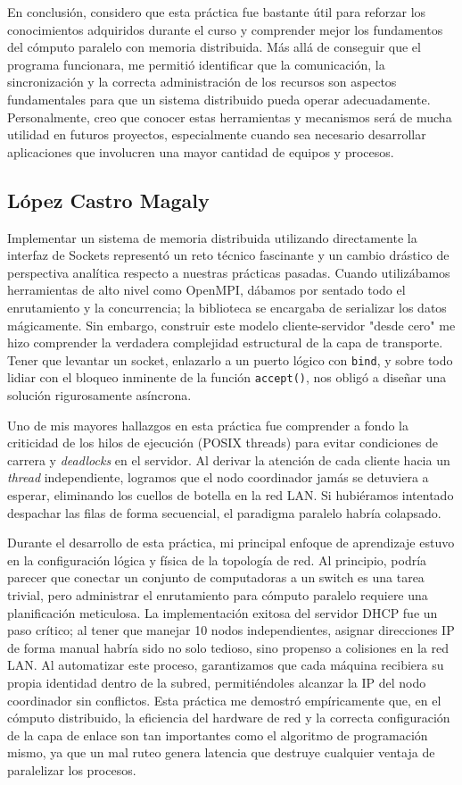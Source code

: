 En conclusión, considero que esta práctica fue bastante útil para reforzar los conocimientos adquiridos durante el curso y comprender mejor los fundamentos del cómputo paralelo con memoria distribuida. Más allá de conseguir que el programa funcionara, me permitió identificar que la comunicación, la sincronización y la correcta administración de los recursos son aspectos fundamentales para que un sistema distribuido pueda operar adecuadamente. Personalmente, creo que conocer estas herramientas y mecanismos será de mucha utilidad en futuros proyectos, especialmente cuando sea necesario desarrollar aplicaciones que involucren una mayor cantidad de equipos y procesos.

\clearpage

\subsection{López Castro Magaly}
Implementar un sistema de memoria distribuida utilizando directamente la interfaz de Sockets representó un reto técnico fascinante y un cambio drástico de perspectiva analítica respecto a nuestras prácticas pasadas. Cuando utilizábamos herramientas de alto nivel como OpenMPI, dábamos por sentado todo el enrutamiento y la concurrencia; la biblioteca se encargaba de serializar los datos mágicamente. Sin embargo, construir este modelo cliente-servidor "desde cero" me hizo comprender la verdadera complejidad estructural de la capa de transporte. Tener que levantar un socket, enlazarlo a un puerto lógico con \texttt{bind}, y sobre todo lidiar con el bloqueo inminente de la función \texttt{accept()}, nos obligó a diseñar una solución rigurosamente asíncrona. 

Uno de mis mayores hallazgos en esta práctica fue comprender a fondo la criticidad de los hilos de ejecución (POSIX threads) para evitar condiciones de carrera y \textit{deadlocks} en el servidor. Al derivar la atención de cada cliente hacia un \textit{thread} independiente, logramos que el nodo coordinador jamás se detuviera a esperar, eliminando los cuellos de botella en la red LAN. Si hubiéramos intentado despachar las filas de forma secuencial, el paradigma paralelo habría colapsado. 

Durante el desarrollo de esta práctica, mi principal enfoque de aprendizaje estuvo en la configuración lógica y física de la topología de red. Al principio, podría parecer que conectar un conjunto de computadoras a un switch es una tarea trivial, pero administrar el enrutamiento para cómputo paralelo requiere una planificación meticulosa. La implementación exitosa del servidor DHCP fue un paso crítico; al tener que manejar 10 nodos independientes, asignar direcciones IP de forma manual habría sido no solo tedioso, sino propenso a colisiones en la red LAN. Al automatizar este proceso, garantizamos que cada máquina recibiera su propia identidad dentro de la subred, permitiéndoles alcanzar la IP del nodo coordinador sin conflictos. Esta práctica me demostró empíricamente que, en el cómputo distribuido, la eficiencia del hardware de red y la correcta configuración de la capa de enlace son tan importantes como el algoritmo de programación mismo, ya que un mal ruteo genera latencia que destruye cualquier ventaja de paralelizar los procesos.

